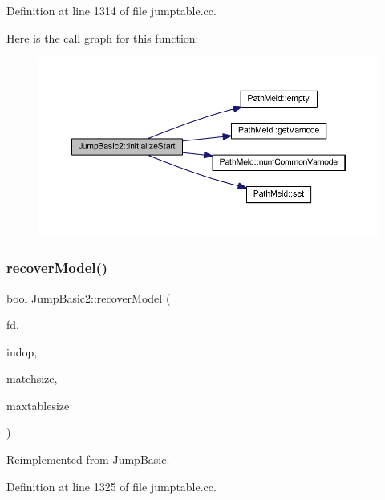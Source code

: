 Definition at line 1314 of file jumptable.\+cc.

Here is the call graph for this function\+:
\nopagebreak
\begin{figure}[H]
\begin{center}
\leavevmode
\includegraphics[width=350pt]{class_jump_basic2_ac228c931935854c24c0e4d7893e93510_cgraph}
\end{center}
\end{figure}
\mbox{\label{class_jump_basic2_adc60ecb0d804d1a7754161b38ae3299f}} 
\subsubsection{\texorpdfstring{recoverModel()}{recoverModel()}}
{\footnotesize\ttfamily bool Jump\+Basic2\+::recover\+Model (\begin{DoxyParamCaption}\item[{\mbox{\hyperlink{class_funcdata}{Funcdata}} $\ast$}]{fd,  }\item[{\mbox{\hyperlink{class_pcode_op}{Pcode\+Op}} $\ast$}]{indop,  }\item[{uint4}]{matchsize,  }\item[{uint4}]{maxtablesize }\end{DoxyParamCaption})\hspace{0.3cm}{\ttfamily [virtual]}}



Reimplemented from \mbox{\hyperlink{class_jump_basic_aebf055ad4baf1a138107d8dd3a40c809}{Jump\+Basic}}.



Definition at line 1325 of file jumptable.\+cc.

